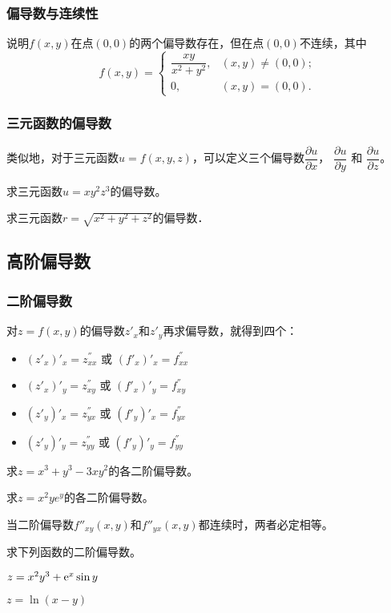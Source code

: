 \documentclass[14pt,notheorems,leqno,xcolor={rgb}]{beamer} %
\begin{document}
\begin{frame}
\frametitle{偏导数与连续性}
\begin{example}
说明$f(x,y)$在点$(0,0)$的两个偏导数存在，但在点$(0,0)$不连续，其中
$$f(x,y)=\left\{\begin{matrix}
  \dfrac{xy}{x^2+y^2}, & (x,y)\neq(0,0); \\ 0, & (x,y)=(0,0).
\end{matrix}\right.$$
\end{example}
\end{frame}

\begin{frame}
\frametitle{三元函数的偏导数}
类似地，对于三元函数$u=f(x,y,z)$，可以定义三个偏导数$\dfrac{\partial u}{\partial x}$，
$\dfrac{\partial u}{\partial y}$ 和 $\dfrac{\partial u}{\partial z}$。
\pause
\begin{example}
求三元函数$u=xy^2z^3$的偏导数。
\end{example}
\pause
\begin{example}
求三元函数$r=\sqrt{x^2+y^2+z^2}$的偏导数．
\end{example}
\end{frame}

\subsection{高阶偏导数}

\begin{frame}
\frametitle{二阶偏导数}
对$z=f(x,y)$的偏导数$z'_x$和$z'_y$再求偏导数，就得到四个：\pause
\begin{itemize}[<+->]
  \item $(z'_x)'_x=z^{''}_{xx}$ 或 $(f'_x)'_x=f^{''}_{xx}$
  \item $(z'_x)'_y=z^{''}_{xy}$ 或 $(f'_x)'_y=f^{''}_{xy}$
  \item $(z'_y)'_x=z^{''}_{yx}$ 或 $(f'_y)'_x=f^{''}_{yx}$
  \item $(z'_y)'_y=z^{''}_{yy}$ 或 $(f'_y)'_y=f^{''}_{yy}$
\end{itemize}
\end{frame}

\begin{frame}
\begin{example}
求$z=x^3+y^3-3xy^2$的各二阶偏导数。
\end{example}
\pause
\begin{example}
求$z=x^2ye^y$的各二阶偏导数。
\end{example}
\vpause
\begin{theorem*}
当二阶偏导数$f''_{xy}(x,y)$和$f''_{yx}(x,y)$都连续时，两者必定相等。
\end{theorem*}
\vpause
\begin{exercise}
求下列函数的二阶偏导数。
\begin{enumlite}
  \item $z=x^2y^3+\mathrm{e}^x\sin y$
  \item $z=\ln(x-y)$
\end{enumlite}
\end{exercise}
\end{frame}
\end{document}
